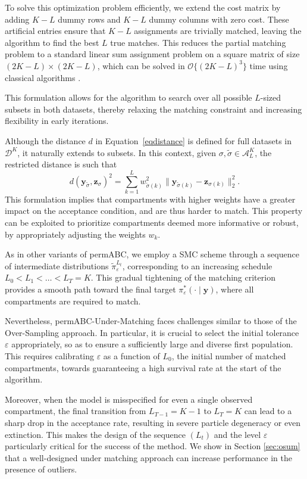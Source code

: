 \documentclass[lineno]{biometrika}
\def\dataspace{\mathcal{D}}
\def\obsdata{\mathbf{y}}
\def\simdata{\mathbf{z}}
\begin{document}
To solve this optimization problem efficiently, we extend the cost matrix by adding \( K - L \) dummy rows and \( K - L \) dummy columns with zero cost. These artificial entries ensure that \( K - L \) assignments are trivially matched, leaving the algorithm to find the best \( L \) true matches. This reduces the partial matching problem to a standard linear sum assignment problem on a square matrix of size \( (2K - L) \times (2K - L) \), which can be solved in \( \mathcal{O}\{(2K-L)^3\} \) time using classical algorithms \citep{crouseImplementing2DRectangular2016a}. 
 

This formulation allows for the algorithm to search over all possible \( L \)-sized subsets in both datasets, thereby relaxing the matching constraint and increasing flexibility in early iterations.

Although the distance \( d \) in Equation~\eqref{eqdistance} is defined for full datasets in \( \dataspace^K \), it naturally extends to subsets. In this context, given \( \sigma, \tilde \sigma \in \mathcal{A}_L^K \), the restricted distance is such that
\[
d(\obsdata_{\tilde \sigma}, \simdata_{\sigma})^2 = {\sum_{k=1}^L w_{\tilde \sigma(k)}^2 \| \obsdata_{\tilde \sigma(k)} - \simdata_{\sigma(k)} \|_2^2}.
\]
This formulation implies that compartments with higher weights have a greater impact on the acceptance condition, and are thus harder to match. This property can be exploited to prioritize compartments deemed more informative or robust, by appropriately adjusting the weights \( w_k \).

As in other variants of permABC, we employ a SMC scheme through a sequence of intermediate distributions \( \tilde{\pi}_\varepsilon^{L_t} \), corresponding to an increasing schedule \( L_0 < L_1 < \dots < L_T = K \). This gradual tightening of the matching criterion provides a smooth path toward the final target \( \pi^*_\varepsilon(\cdot \mid \obsdata) \), where all compartments are required to match.

Nevertheless, permABC-Under-Matching faces challenges similar to those of the Over-Sampling approach. In particular, it is crucial to select the initial tolerance \( \varepsilon \) appropriately, so as to ensure a sufficiently large and diverse first population. This requires calibrating \( \varepsilon \) as a function of \( L_0 \), the initial number of matched compartments, towards guaranteeing a high survival rate at the start of the algorithm.

Moreover, when the model is misspecified for even a single observed compartment, the final transition from \( L_{T-1} = K - 1 \) to \( L_T = K \) can lead to a sharp drop in the acceptance rate, resulting in severe particle degeneracy or even extinction. This makes the design of the sequence \( (L_t) \) and the level \( \varepsilon \) particularly critical for the success of the method. 
We show in Section \ref{sec:osum} that a well-designed under matching approach can increase performance in the presence of outliers.
\end{document}
